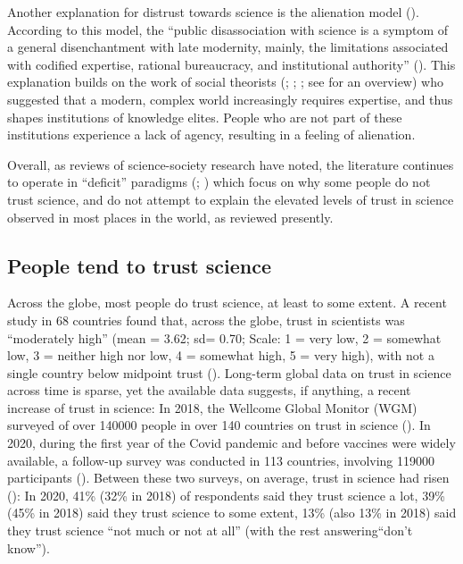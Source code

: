 \documentclass[
  jou,
  floatsintext,
  longtable,
  nolmodern,
  notxfonts,
  notimes,
  colorlinks=true,linkcolor=blue,citecolor=blue,urlcolor=blue]{apa7}
\begin{document}
Another explanation for distrust towards science is the alienation model
().
According to this model, the ``public disassociation with science is a
symptom of a general disenchantment with late modernity, mainly, the
limitations associated with codified expertise, rational bureaucracy,
and institutional authority''
(). This explanation builds on the work of social theorists
(;
;
; see
 for an
overview) who suggested that a modern, complex world increasingly
requires expertise, and thus shapes institutions of knowledge elites.
People who are not part of these institutions experience a lack of
agency, resulting in a feeling of alienation.

Overall, as reviews of science-society research have noted, the
literature continues to operate in ``deficit'' paradigms
(;
) which
focus on why some people do not trust science, and do not attempt to
explain the elevated levels of trust in science observed in most places
in the world, as reviewed presently.

\subsection{People tend to trust
science}\label{people-tend-to-trust-science}

Across the globe, most people do trust science, at least to some extent.
A recent study in 68 countries found that, across the globe, trust in
scientists was ``moderately high'' (mean = 3.62; sd= 0.70; Scale: 1 =
very low, 2 = somewhat low, 3 = neither high nor low, 4 = somewhat high,
5 = very high), with not a single country below midpoint trust
().
Long-term global data on trust in science across time is sparse, yet the
available data suggests, if anything, a recent increase of trust in
science: In 2018, the Wellcome Global Monitor (WGM) surveyed of over
140000 people in over 140 countries on trust in science
(). In 2020, during the first year of the Covid
pandemic and before vaccines were widely available, a follow-up survey
was conducted in 113 countries, involving 119000 participants
(). Between these two surveys, on average, trust in
science had risen
(): In 2020, 41\% (32\% in 2018) of respondents said
they trust science a lot, 39\% (45\% in 2018) said they trust science to
some extent, 13\% (also 13\% in 2018) said they trust science ``not much
or not at all'' (with the rest answering``don't know'').
\end{document}
